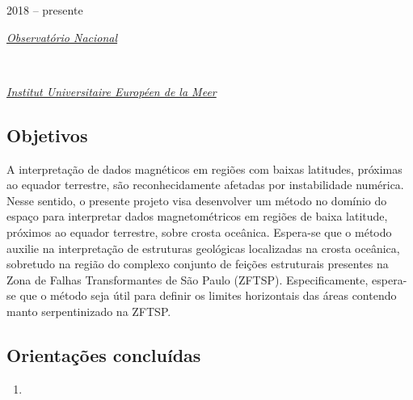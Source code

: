 2018 -- presente
\vspace{0.3\baselineskip}\\
\noindent\parbox{0.03\textwidth}{\vspace{-0.2\baselineskip}\faUniversity} \href{https://www.gov.br/observatorio/pt-br}{\textsl{Observatório Nacional}}
\parbox{0.03\textwidth}{\vspace{-0.2\baselineskip} \hfill {}} \\
\noindent\parbox{0.03\textwidth}{\vspace{-0.2\baselineskip}\faUniversity}
\href{https://www-iuem.univ-brest.fr/}{\textsl{Institut Universitaire Européen de la Meer}}
\parbox{0.03\textwidth}{\vspace{-0.2\baselineskip} \hfill {}}

\subsection*{Objetivos}

A interpretação de dados magnéticos em regiões com baixas latitudes, próximas ao
equador terrestre, são reconhecidamente afetadas por instabilidade numérica.
Nesse sentido, o presente projeto visa desenvolver um método no domínio do espaço 
para interpretar dados magnetométricos em regiões de baixa latitude, próximos ao equador
terrestre, sobre crosta oceânica. 
Espera-se que o método auxilie na interpretação de estruturas geológicas localizadas na
crosta oceânica, sobretudo na região do complexo conjunto de feições estruturais presentes
na Zona de Falhas Transformantes de São Paulo (ZFTSP). Especificamente, espera-se que o
método seja útil para definir os limites horizontais das áreas
contendo manto serpentinizado na ZFTSP.

\subsection*{Orientações concluídas}

\begin{enumerate}
	
	\item{}
	
\end{enumerate}

